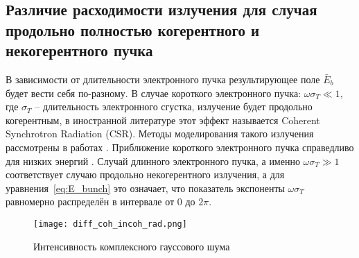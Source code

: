 \subsection{Различие расходимости излучения для случая продольно полностью когерентного и некогерентного пучка}
В зависимости от длительности электронного пучка результирующее поле $\bar{E}_{b}$ будет вести себя по-разному. В случае короткого электронного пучка: $\omega \sigma_T \ll 1$, где $\sigma_T$ -- длительность электронного сгустка, излучение будет продольно когерентным, в иностранной литературе этот эффект называется Coherent Synchrotron Radiation (CSR). Методы моделирования такого излучения рассмотрены в работах . Приближение короткого электронного пучка справедливо для низких энергий . Случай длинного электронного пучка, а именно  $\omega \sigma_T \gg 1$ соответствует случаю продольно некогерентного излучения, а для уравнения~\ref{eq:E_bunch} это означает, что показатель экспоненты $\omega \sigma_T$ равномерно распределён в интервале от $0$ до $2 \pi$. 


\begin{figure}[H] 
	\centering 	\texttt{[image: diff\_coh\_incoh\_rad.png]}
	\caption{Интенсивность комплексного гауссового шума}
	\label{fig:diff_coh_incoh_rad}
\end{figure}
